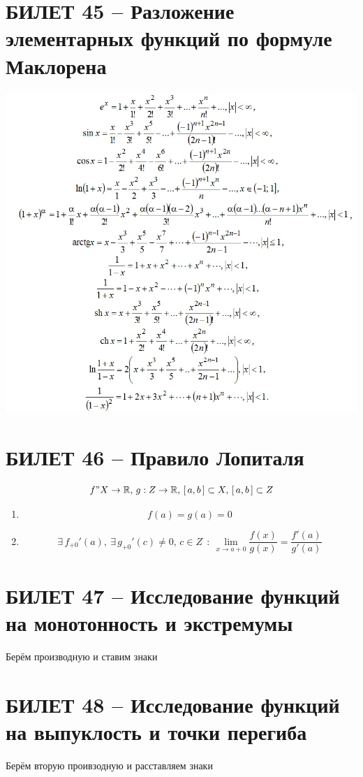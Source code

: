 \documentclass{article}
\newcommand{\R}{\mathbb R}
\begin{document}
\section{БИЛЕТ 45 -- Разложение элементарных функций по формуле Маклорена}
\begin{center}
\includegraphics[scale=0.5]{12.jpg}
\end{center}
\newpage
\section{БИЛЕТ 46 -- Правило Лопиталя}
$$ f"X\to\R,\,g:Z\to\R,\,[\,a,b\,]\subset X,\,[\,a,b\,]\subset Z $$
\begin{enumerate}
    \item $$ f(a)=g(a)=0 $$
    \item $$ \exists\,f_{+0}'(a),\:\exists\,g_{+0}'(c)\neq 0,\,c\in Z\:\::\:\lim_{x\to a+0}\frac{f(x)}{g(x)}=\frac{f'(a)}{g'(a)} $$
\end{enumerate}
\newpage
\section{БИЛЕТ 47 -- Исследование функций на монотонность и экстремумы}
Берём производную и ставим знаки
\newpage
\section{БИЛЕТ 48 -- Исследование функций на выпуклость и точки перегиба}
Берём вторую проивзодную и расставляем знаки
\newpage
\end{document}
